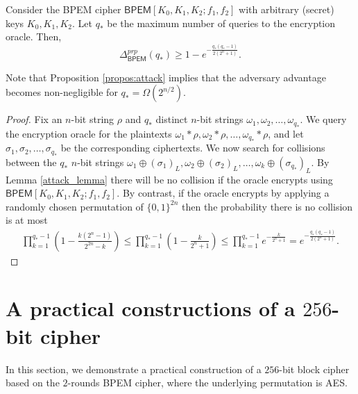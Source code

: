 \documentclass{llncs}
\newcommand{\s}{\{0,1\}}
\newcommand{\tx}{\textsf}
\begin{document}
\begin{proposition}\label{propos:attack}
Consider the BPEM cipher $\tx{BPEM}[K_0, K_1, K_2;f_1,f_2]$ with arbitrary (secret) keys
$K_0, K_1, K_2$.
Let $q_{*}$ be the maximum number of queries to the encryption oracle. Then,
$$
\Delta^{prp}_{\tx{BPEM}}(q_{*})\geq
1-e^{-\frac{q_{*}(q_{*}-1)}{2(2^n+1)}}.
$$
\end{proposition}
\begin{remark}
Note that Proposition \ref{propos:attack} implies that the adversary advantage becomes non-negligible for $q_{*}=\Omega(2^{n/2})$.
\end{remark}
\begin{proof}
 Fix an $n$-bit string $\rho$ and $q_{*}$ distinct $n$-bit strings $\omega_1, \omega_2,\ldots,\omega_{q_{*}}$. We query the encryption oracle for the plaintexts $\omega_1*\rho,\omega_2*\rho,\ldots,\omega_{q_{*}}*\rho$, and let $\sigma_1,\sigma_2,\ldots,\sigma_{q_{*}}$ be the corresponding ciphertexts. We now search for collisions between the ${q_{*}}$ $n$-bit strings $\omega_1\oplus (\sigma_1)_L,\omega_2\oplus (\sigma_2)_L,\ldots,\omega_k\oplus (\sigma_{q_{*}})_L$.
By Lemma \ref{attack_lemma} there will be no collision if the oracle encrypts using $\tx{BPEM}[K_0,K_1, K_2; f_1, f_2]$. By contrast, if the oracle encrypts by applying a randomly chosen permutation of $\s^{2n}$ then the probability there is no collision is at most
\begin{gather*}
\prod_{k=1}^{{q_{*}}-1} \left(1-\frac{k(2^n-1)}{2^{2n}-k}\right)\leq \prod_{k=1}^{{q_{*}}-1} \left(1-\frac{k}{2^n+1}\right)\leq\prod_{k=1}^{{q_{*}}-1} e^{-\frac{k}{2^n+1}}=e^{-\frac{{q_{*}}({q_{*}}-1)}{2(2^n+1)}}.
\end{gather*}
\end{proof}

\section{A practical constructions of a $256$-bit cipher}
\label{sec:practical}

In this section, we demonstrate a practical construction of a $256$-bit block cipher based on the $2$-rounds BPEM cipher, where the underlying permutation is AES.
\end{document}
